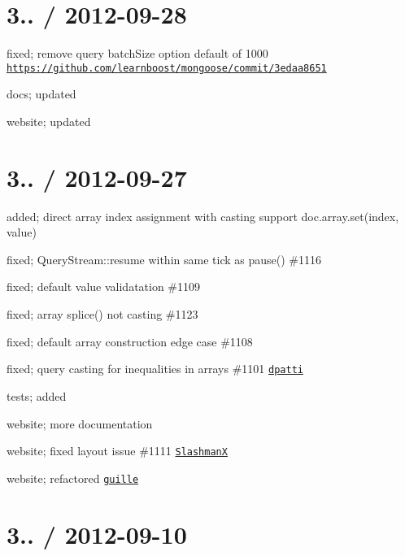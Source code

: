 \section*{3.. / 2012-\/09-\/28 }


\begin{DoxyItemize}
\item fixed; remove query batch\+Size option default of 1000 \href{https://github.com/learnboost/mongoose/commit/3edaa8651}{\tt https\+://github.\+com/learnboost/mongoose/commit/3edaa8651}
\item docs; updated
\item website; updated
\end{DoxyItemize}

\section*{3.. / 2012-\/09-\/27 }


\begin{DoxyItemize}
\item added; direct array index assignment with casting support {\ttfamily doc.\+array.\+set(index, value)}
\item fixed; Query\+Stream\+::resume within same tick as pause() \#1116
\item fixed; default value validatation \#1109
\item fixed; array splice() not casting \#1123
\item fixed; default array construction edge case \#1108
\item fixed; query casting for inequalities in arrays \#1101 \href{https://github.com/dpatti}{\tt dpatti}
\item tests; added
\item website; more documentation
\item website; fixed layout issue \#1111 \href{https://github.com/SlashmanX}{\tt SlashmanX}
\item website; refactored \href{https://github.com/guille}{\tt guille}
\end{DoxyItemize}

\section*{3.. / 2012-\/09-\/10 }


